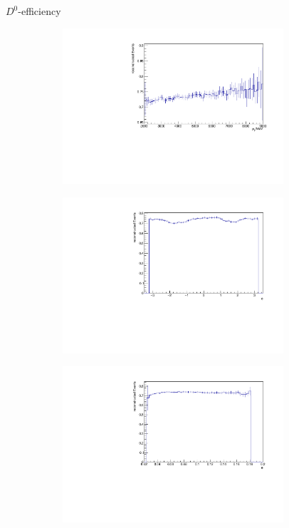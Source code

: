 \documentclass[11pt]{beamer}
\begin{document}
\begin{frame}{$D^0$-efficiency}
\begin{figure}
\begin{subfigure}{0.45\textwidth}
\includegraphics[width=0.9\textwidth]{up_pdf/tot/h_pt_reco_D0.pdf}
\end{subfigure}
\begin{subfigure}{0.45\textwidth}
\includegraphics[width=0.9\textwidth]{up_pdf/tot/h_phi_reco_D0.pdf}
\end{subfigure}
\begin{subfigure}{0.45\textwidth}
\includegraphics[width=0.9\textwidth]{up_pdf/tot/h_theta_reco_D0.pdf}

\end{subfigure}
\end{figure}
\end{frame}
\end{document}

